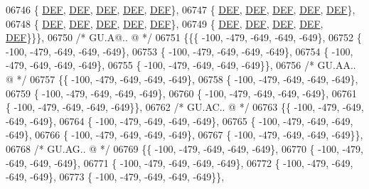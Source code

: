\begin{DoxyCode}
06746 \{  \mbox{\hyperlink{1_88_84__epars_8h_a397419fc12b37ed479c8abb9d444d843}{DEF}},  \mbox{\hyperlink{1_88_84__epars_8h_a397419fc12b37ed479c8abb9d444d843}{DEF}},  \mbox{\hyperlink{1_88_84__epars_8h_a397419fc12b37ed479c8abb9d444d843}{DEF}},  \mbox{\hyperlink{1_88_84__epars_8h_a397419fc12b37ed479c8abb9d444d843}{DEF}},  \mbox{\hyperlink{1_88_84__epars_8h_a397419fc12b37ed479c8abb9d444d843}{DEF}}\},
06747 \{  \mbox{\hyperlink{1_88_84__epars_8h_a397419fc12b37ed479c8abb9d444d843}{DEF}},  \mbox{\hyperlink{1_88_84__epars_8h_a397419fc12b37ed479c8abb9d444d843}{DEF}},  \mbox{\hyperlink{1_88_84__epars_8h_a397419fc12b37ed479c8abb9d444d843}{DEF}},  \mbox{\hyperlink{1_88_84__epars_8h_a397419fc12b37ed479c8abb9d444d843}{DEF}},  \mbox{\hyperlink{1_88_84__epars_8h_a397419fc12b37ed479c8abb9d444d843}{DEF}}\},
06748 \{  \mbox{\hyperlink{1_88_84__epars_8h_a397419fc12b37ed479c8abb9d444d843}{DEF}},  \mbox{\hyperlink{1_88_84__epars_8h_a397419fc12b37ed479c8abb9d444d843}{DEF}},  \mbox{\hyperlink{1_88_84__epars_8h_a397419fc12b37ed479c8abb9d444d843}{DEF}},  \mbox{\hyperlink{1_88_84__epars_8h_a397419fc12b37ed479c8abb9d444d843}{DEF}},  \mbox{\hyperlink{1_88_84__epars_8h_a397419fc12b37ed479c8abb9d444d843}{DEF}}\},
06749 \{  \mbox{\hyperlink{1_88_84__epars_8h_a397419fc12b37ed479c8abb9d444d843}{DEF}},  \mbox{\hyperlink{1_88_84__epars_8h_a397419fc12b37ed479c8abb9d444d843}{DEF}},  \mbox{\hyperlink{1_88_84__epars_8h_a397419fc12b37ed479c8abb9d444d843}{DEF}},  \mbox{\hyperlink{1_88_84__epars_8h_a397419fc12b37ed479c8abb9d444d843}{DEF}},  \mbox{\hyperlink{1_88_84__epars_8h_a397419fc12b37ed479c8abb9d444d843}{DEF}}\}\}\},
06750 \textcolor{comment}{/* GU.A@.. @ */}
06751 \{\{\{ -100, -479, -649, -649, -649\},
06752 \{ -100, -479, -649, -649, -649\},
06753 \{ -100, -479, -649, -649, -649\},
06754 \{ -100, -479, -649, -649, -649\},
06755 \{ -100, -479, -649, -649, -649\}\},
06756 \textcolor{comment}{/* GU.AA.. @ */}
06757 \{\{ -100, -479, -649, -649, -649\},
06758 \{ -100, -479, -649, -649, -649\},
06759 \{ -100, -479, -649, -649, -649\},
06760 \{ -100, -479, -649, -649, -649\},
06761 \{ -100, -479, -649, -649, -649\}\},
06762 \textcolor{comment}{/* GU.AC.. @ */}
06763 \{\{ -100, -479, -649, -649, -649\},
06764 \{ -100, -479, -649, -649, -649\},
06765 \{ -100, -479, -649, -649, -649\},
06766 \{ -100, -479, -649, -649, -649\},
06767 \{ -100, -479, -649, -649, -649\}\},
06768 \textcolor{comment}{/* GU.AG.. @ */}
06769 \{\{ -100, -479, -649, -649, -649\},
06770 \{ -100, -479, -649, -649, -649\},
06771 \{ -100, -479, -649, -649, -649\},
06772 \{ -100, -479, -649, -649, -649\},
06773 \{ -100, -479, -649, -649, -649\}\},

\end{DoxyCode}
